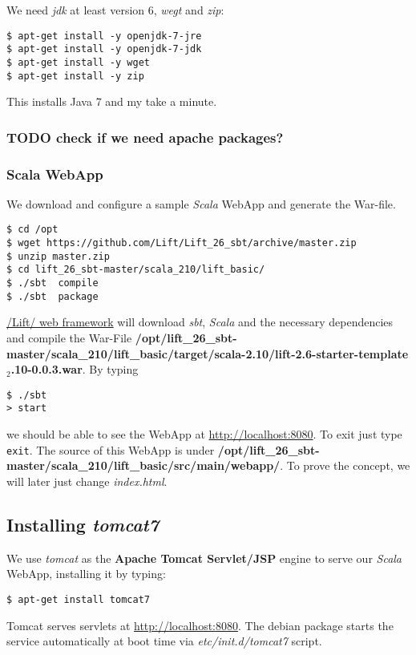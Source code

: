 \documentclass[11pt]{article}
\begin{document}
We need \emph{jdk} at least version 6, \emph{wegt} and \emph{zip}:

\begin{verbatim}
$ apt-get install -y openjdk-7-jre
$ apt-get install -y openjdk-7-jdk
$ apt-get install -y wget
$ apt-get install -y zip
\end{verbatim}
This installs Java 7 and my take a minute.
\subsubsection{\textbf{TODO} check if we need apache packages?}
\label{sec-3-1-2}
\subsubsection{Scala WebApp}
\label{sec-3-1-3}

We download and configure a sample \emph{Scala} WebApp and generate the War-file.

\begin{verbatim}
$ cd /opt
$ wget https://github.com/Lift/Lift_26_sbt/archive/master.zip
$ unzip master.zip
$ cd lift_26_sbt-master/scala_210/lift_basic/
$ ./sbt  compile
$ ./sbt  package
\end{verbatim}
\href{http:///Lift/web.net/getting_started}{/Lift/ web framework}  will download \emph{sbt}, \emph{Scala} and the necessary dependencies and compile the War-File \textbf{/opt/lift\_26\_sbt-master/scala\_210/lift\_basic/target/scala-2.10/lift-2.6-starter-template$_2$.10-0.0.3.war}. By typing

\begin{verbatim}
$ ./sbt 
> start
\end{verbatim}
we should be able to see the WebApp at \href{http://localhost:8080}{http://localhost:8080}. To exit just type \texttt{exit}. The source of this WebApp is under \textbf{/opt/lift\_26\_sbt-master/scala\_210/lift\_basic/src/main/webapp/}. To prove the concept, we will later just change \emph{index.html}.
\subsection{Installing \emph{tomcat7}}
\label{sec-3-2}

We use \emph{tomcat} as the \textbf{Apache Tomcat Servlet/JSP} engine to serve our \emph{Scala} WebApp, installing it by typing:

\begin{verbatim}
$ apt-get install tomcat7
\end{verbatim}
Tomcat serves servlets  at \href{http://localhost:8080}{http://localhost:8080}. The debian package starts the service automatically at boot time via \emph{etc/init.d/tomcat7} script.
\end{document}
